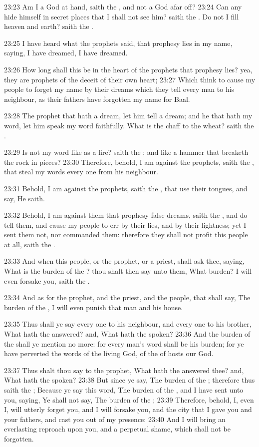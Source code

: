 23:23 Am I a God at hand, saith the \LORD, and not a God afar off?
23:24 Can any hide himself in secret places that I shall not see him?
saith the \LORD. Do not I fill heaven and earth? saith the \LORD.

23:25 I have heard what the prophets said, that prophesy lies in my
name, saying, I have dreamed, I have dreamed.

23:26 How long shall this be in the heart of the prophets that
prophesy lies? yea, they are prophets of the deceit of their own
heart; 23:27 Which think to cause my people to forget my name by their
dreams which they tell every man to his neighbour, as their fathers
have forgotten my name for Baal.

23:28 The prophet that hath a dream, let him tell a dream; and he that
hath my word, let him speak my word faithfully. What is the chaff to
the wheat? saith the \LORD.

23:29 Is not my word like as a fire? saith the \LORD; and like a hammer
that breaketh the rock in pieces?  23:30 Therefore, behold, I am
against the prophets, saith the \LORD, that steal my words every one
from his neighbour.

23:31 Behold, I am against the prophets, saith the \LORD, that use
their tongues, and say, He saith.

23:32 Behold, I am against them that prophesy false dreams, saith the
\LORD, and do tell them, and cause my people to err by their lies, and
by their lightness; yet I sent them not, nor commanded them: therefore
they shall not profit this people at all, saith the \LORD.

23:33 And when this people, or the prophet, or a priest, shall ask
thee, saying, What is the burden of the \LORD? thou shalt then say unto
them, What burden? I will even forsake you, saith the \LORD.

23:34 And as for the prophet, and the priest, and the people, that
shall say, The burden of the \LORD, I will even punish that man and his
house.

23:35 Thus shall ye say every one to his neighbour, and every one to
his brother, What hath the \LORD answered? and, What hath the \LORD
spoken?  23:36 And the burden of the \LORD shall ye mention no more:
for every man's word shall be his burden; for ye have perverted the
words of the living God, of the \LORD of hosts our God.

23:37 Thus shalt thou say to the prophet, What hath the \LORD answered
thee? and, What hath the \LORD spoken?  23:38 But since ye say, The
burden of the \LORD; therefore thus saith the \LORD; Because ye say this
word, The burden of the \LORD, and I have sent unto you, saying, Ye
shall not say, The burden of the \LORD; 23:39 Therefore, behold, I,
even I, will utterly forget you, and I will forsake you, and the city
that I gave you and your fathers, and cast you out of my presence:
23:40 And I will bring an everlasting reproach upon you, and a
perpetual shame, which shall not be forgotten.

